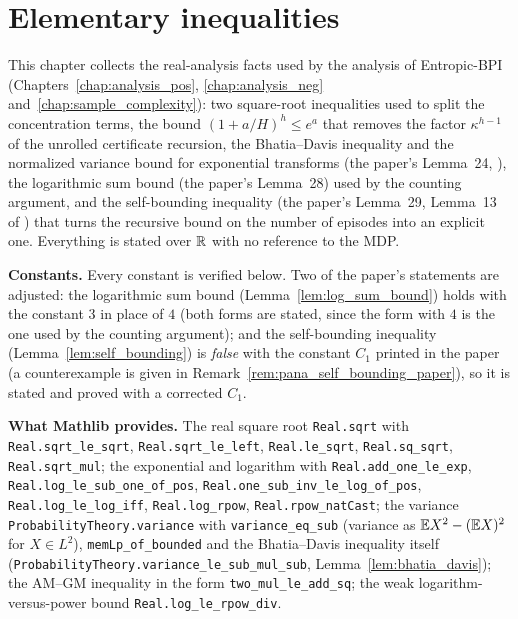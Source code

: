 \chapter{Elementary inequalities}
\label{chap:pre_analysis}

This chapter collects the real-analysis facts used by the analysis of Entropic-BPI
(Chapters~\ref{chap:analysis_pos}, \ref{chap:analysis_neg} and~\ref{chap:sample_complexity}):
two square-root inequalities used to split the concentration terms, the bound
$(1 + a/H)^h \le e^a$ that removes the factor $\kappa^{h-1}$ of the unrolled certificate
recursion, the Bhatia--Davis inequality and the normalized variance bound for exponential
transforms (the paper's Lemma~24, \cite{essakine2026tight}), the logarithmic sum bound (the
paper's Lemma~28) used by the counting argument, and the self-bounding inequality (the paper's
Lemma~29, Lemma~13 of \cite{menard2021fast}) that turns the recursive bound on the number of
episodes into an explicit one. Everything is stated over $\mathbb{R}$ with no reference to the MDP.

\textbf{Constants.} Every constant is verified below. Two of the paper's statements are
adjusted: the logarithmic sum bound (Lemma~\ref{lem:log_sum_bound}) holds with the constant
$3$ in place of $4$ (both forms are stated, since the form with $4$ is the one used by the
counting argument); and the self-bounding inequality
(Lemma~\ref{lem:self_bounding}) is \emph{false} with the constant $C_1$ printed in the paper
(a counterexample is given in Remark~\ref{rem:pana_self_bounding_paper}), so it is stated and
proved with a corrected $C_1$.

\textbf{What Mathlib provides.} The real square root \texttt{Real.sqrt} with
\texttt{Real.sqrt\_le\_sqrt}, \texttt{Real.sqrt\_le\_left}, \texttt{Real.le\_sqrt},
\texttt{Real.sq\_sqrt}, \texttt{Real.sqrt\_mul}; the exponential and logarithm with
\texttt{Real.add\_one\_le\_exp}, \texttt{Real.log\_le\_sub\_one\_of\_pos},
\texttt{Real.one\_sub\_inv\_le\_log\_of\_pos}, \texttt{Real.log\_le\_log\_iff},
\texttt{Real.log\_rpow}, \texttt{Real.rpow\_natCast}; the variance
\texttt{ProbabilityTheory.variance} with \texttt{variance\_eq\_sub} (variance as
$\mathbb{E} X^2 - (\mathbb{E} X)^2$ for $X \in L^2$), \texttt{memLp\_of\_bounded} and the Bhatia--Davis
inequality itself (\texttt{ProbabilityTheory.variance\_le\_sub\_mul\_sub},
Lemma~\ref{lem:bhatia_davis}); the AM--GM inequality in the form \texttt{two\_mul\_le\_add\_sq};
the weak logarithm-versus-power bound \texttt{Real.log\_le\_rpow\_div}.

